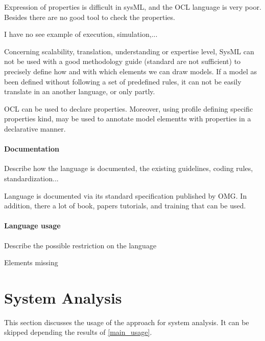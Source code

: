 \begin{assessor2}
Expression of properties is difficult in sysML, and the OCL language is very poor. Besides there are no good tool to check the properties. 

I have no see example of execution, simulation,...

Concerning scalability, translation, understanding or expertise level, SysML can not be used with a good methodology guide (standard are not sufficient)  to  precisely define how and with which elements we can draw models. If a model as been defined without following a set of predefined rules, it can not be easily translate in an another language, or only  partly.
\end{assessor2}

\begin{author_comment}
OCL can be used to declare properties. Moreover, using profile defining specific properties kind, may be used to annotate model elementts with properties in a declarative manner.
\end{author_comment}

\paragraph{Documentation} Describe how the language is documented, the existing guidelines, coding rules, standardization...

\begin{author_comment}
Language is documented via its standard specification published by OMG. In addition, there a lot of book, papers tutorials, and training that can be used.
\end{author_comment}


\paragraph{Language usage} Describe the possible restriction on the language


\begin{assessor2}
Elements missing
\end{assessor2}



\section{System Analysis}
This section discusses the usage of the approach for system analysis.
It can be skipped depending the results of \ref{main_usage}.

